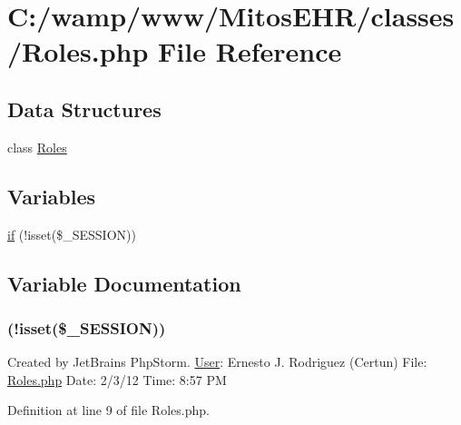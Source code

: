 \hypertarget{_roles_8php}{\section{\-C\-:/wamp/www/\-Mitos\-E\-H\-R/classes/\-Roles.php \-File \-Reference}
\label{_roles_8php}
}
\subsection*{\-Data \-Structures}
\begin{DoxyCompactItemize}
\item 
class \hyperlink{class_roles}{\-Roles}
\end{DoxyCompactItemize}
\subsection*{\-Variables}
\begin{DoxyCompactItemize}
\item 
\hyperlink{_roles_8php_a8ceca98aa29914fd2479a84a8d2242fb}{if} (!isset(\$\-\_\-\-S\-E\-S\-S\-I\-O\-N))
\end{DoxyCompactItemize}


\subsection{\-Variable \-Documentation}
\hypertarget{_roles_8php_a8ceca98aa29914fd2479a84a8d2242fb}{
\subsubsection[{if}]{(!isset(\$\-\_\-\-S\-E\-S\-S\-I\-O\-N))}}\label{_roles_8php_a8ceca98aa29914fd2479a84a8d2242fb}
\-Created by \-Jet\-Brains \-Php\-Storm. \hyperlink{class_user}{\-User}\-: \-Ernesto \-J. \-Rodriguez (\-Certun) \-File\-: \hyperlink{_roles_8php}{\-Roles.\-php} \-Date\-: 2/3/12 \-Time\-: 8\-:57 \-P\-M 

\-Definition at line 9 of file \-Roles.\-php.

